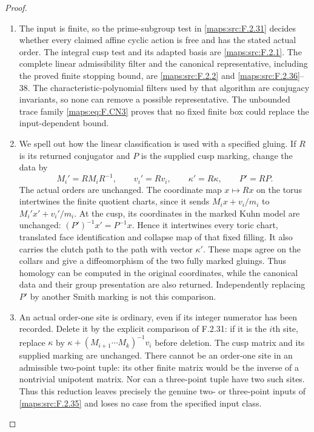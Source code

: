 \begin{proof}
\begin{enumerate}[label=\arabic*.]
\item The input is finite, so the prime-subgroup test in \ref{maps:src:F.2.31}
decides whether every claimed affine cyclic action is free
and has the stated actual order.  The integral cusp test and
its adapted basis are \ref{maps:src:F.2.1}.  The complete linear admissibility
filter and the canonical representative, including the proved
finite stopping bound, are \ref{maps:src:F.2.2} and \ref{maps:src:F.2.36}--38.  The
characteristic-polynomial filters used by that algorithm are
conjugacy invariants, so none can remove a possible
representative.  The unbounded trace family \eqref{maps:eq:F.CN3} proves
that no fixed finite box could replace the input-dependent
bound.

\item We spell out how the linear classification is used with a
specified gluing.  If $R$ is its returned conjugator and
$P$ is the supplied cusp marking, change the data by
\[
 M_i'=RM_iR^{-1},\qquad v_i'=Rv_i,\qquad
 \kappa'=R\kappa,\qquad P'=RP.                           \tag{F.SY1}\label{maps:eq:F.SY1}
\]
The actual orders are unchanged.  The coordinate map
$x\mapsto Rx$ on the torus intertwines the finite quotient
charts, since it sends $M_ix+v_i/m_i$ to
$M_i'x'+v_i'/m_i$.  At the cusp, its coordinates in the
marked Kuhn model are unchanged:
$(P')^{-1}x'=P^{-1}x$.  Hence it intertwines every toric
chart, translated face identification and collapse map of
that fixed filling.  It also carries the clutch path to
the path with vector $\kappa'$.  These maps agree on the
collars and give a diffeomorphism of the two fully marked
gluings.  Thus homology can be computed in the original
coordinates, while the canonical data and their group
presentation are also returned.  Independently replacing
$P'$ by another Smith marking is not this comparison.

\item An actual order-one site is ordinary, even if its integer
numerator has been recorded.  Delete it by the explicit
comparison of F.2.31: if it is the $i$th site, replace
$\kappa$ by
$\kappa+(M_{i+1}\cdots M_k)^{-1}v_i$ before deletion.
The cusp matrix and its supplied marking are unchanged.
There cannot be an order-one site in an admissible two-point
tuple: its other finite matrix would be the inverse of a
nontrivial unipotent matrix.  Nor can a three-point tuple
have two such sites.  Thus this reduction leaves precisely
the genuine two- or three-point inputs of \ref{maps:src:F.2.35} and loses
no case from the specified input class.


\end{enumerate}
\end{proof}
